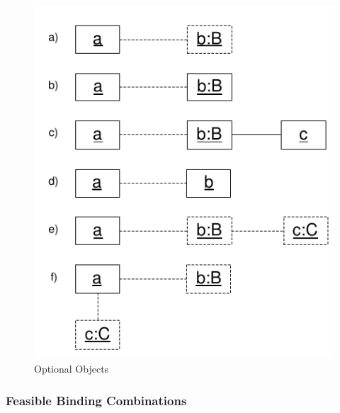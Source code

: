 \begin{figure}[htbp]
  \centering
  \includegraphics[scale=1]{figures/optionalObjects}
  \caption{Optional Objects}
  \label{fig:optionalObjects}
\end{figure}


\subsubsection{Feasible Binding Combinations}

